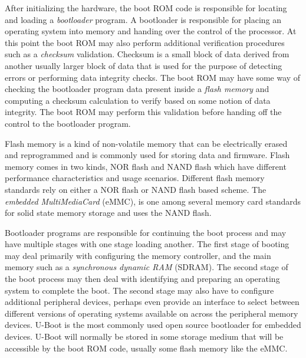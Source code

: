 After initializing the hardware, the boot ROM code is responsible for locating and loading a \textit{bootloader} program. A bootloader is responsible for placing an operating system into memory and handing over the control of the processor. At this point the boot ROM may also perform additional verification procedures such as a \textit{checksum} validation. Checksum is a small block of data derived from another usually larger block of data that is used for the purpose of detecting errors or performing data integrity checks. The boot ROM may have some way of checking the bootloader program data present inside a \textit{flash memory} and computing a checksum calculation to verify based on some notion of data integrity. The boot ROM may perform this validation before handing off the control to the bootloader program.

Flash memory is a kind of non-volatile memory that can be electrically erased and reprogrammed and is commonly used for storing data and firmware. Flash memory comes in two kinds, NOR flash and NAND flash which have different performance characteristics and usage scenarios. Different flash memory standards rely on either a NOR flash or NAND flash based scheme. The \textit{embedded MultiMediaCard} (eMMC), is one among several memory card standards for solid state memory storage and uses the NAND flash.

Bootloader programs are responsible for continuing the boot process and may have multiple stages with one stage loading another. The first stage of booting may deal primarily with configuring the memory controller, and the main memory such as a \textit{synchronous dynamic RAM} (SDRAM). The second stage of the boot process may then deal with identifying and preparing an operating system to complete the boot. The second stage may also have to configure additional peripheral devices, perhaps even provide an interface to select between different versions of operating systems available on across the peripheral memory devices. U-Boot is the most commonly used open source bootloader for embedded devices. U-Boot will normally be stored in some storage medium that will be accessible by the boot ROM code, usually some flash memory like the eMMC.


